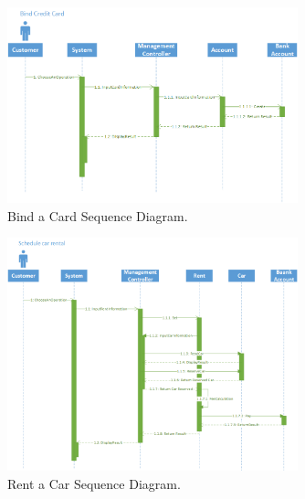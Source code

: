 \documentclass{article}
\begin{document}
        \begin{figure}[h]
            \centering
            \includegraphics[width=0.75\textwidth]{img/SequenceDiagramBindCard.png}
            \caption{Bind a Card Sequence Diagram.}
            \label{fig:SequenceDiagramBindCard}
        \end{figure}
            
        \begin{figure}[h]
            \centering
            \includegraphics[width=0.75\textwidth]{img/SequenceDiagramRentCar.png}
            \caption{Rent a Car Sequence Diagram.}
            \label{fig:SequenceDiagramRentCar}
        \end{figure}

%  
%
\end{document}
